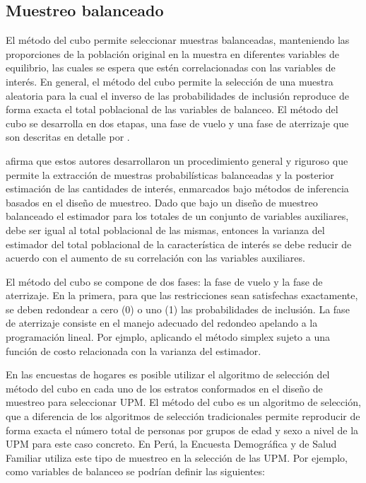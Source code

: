 \documentclass[
  10pt,
  spanish,
]{book}
\begin{document}
\hypertarget{muestreo-balanceado}{%
\subsection*{Muestreo balanceado}\label{muestreo-balanceado}}

El método del cubo permite seleccionar muestras balanceadas, manteniendo las proporciones de la población original en la muestra en diferentes variables de equilibrio, las cuales se espera que estén correlacionadas con las variables de interés. En general, el método del cubo permite la selección de una muestra aleatoria para la cual el inverso de las probabilidades de inclusión reproduce de forma exacta el total poblacional de las variables de balanceo. El método del cubo se desarrolla en dos etapas, una fase de vuelo y una fase de aterrizaje que son descritas en detalle por \citet{Tille2006}.

\citet{Gutierrez_2016} afirma que estos autores desarrollaron un procedimiento general y riguroso que permite la extracción de muestras probabilísticas balanceadas y la posterior estimación de las cantidades de interés, enmarcados bajo métodos de inferencia basados en el diseño de muestreo. Dado que bajo un diseño de muestreo balanceado el estimador para los totales de un conjunto de variables auxiliares, debe ser igual al total poblacional de las mismas, entonces la varianza del estimador del total poblacional de la característica de interés se debe reducir de acuerdo con el aumento de su correlación con las variables auxiliares.

El método del cubo se compone de dos fases: la fase de vuelo y la fase de aterrizaje. En la primera, para que las restricciones sean satisfechas exactamente, se deben redondear a cero (0) o uno (1) las probabilidades de inclusión. La fase de aterrizaje consiste en el manejo adecuado del redondeo apelando a la programación lineal. Por ejmplo, aplicando el método simplex sujeto a una función de costo relacionada con la varianza del estimador.

En las encuestas de hogares es posible utilizar el algoritmo de selección del método del cubo en cada uno de los estratos conformados en el diseño de muestreo para seleccionar UPM. El método del cubo es un algoritmo de selección, que a diferencia de los algoritmos de selección tradicionales permite reproducir de forma exacta el número total de personas por grupos de edad y sexo a nivel de la UPM para este caso concreto. En Perú, la Encuesta Demográfica y de Salud Familiar utiliza este tipo de muestreo en la selección de las UPM. Por ejemplo, como variables de balanceo se podrían definir las siguientes:
\end{document}
